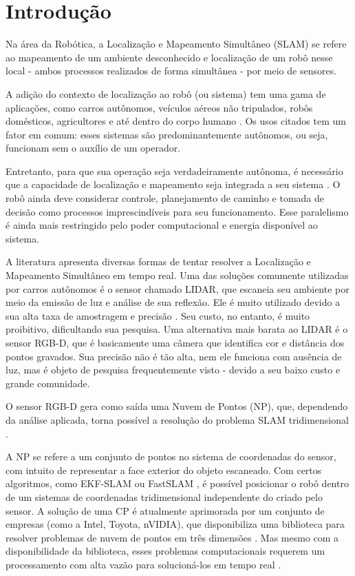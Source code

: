	\chapter*[Introdução]{Introdução}

	Na área da Robótica, a Localização e Mapeamento Simultâneo (SLAM) se refere ao mapeamento de um ambiente desconhecido e localização de um robô nesse local - ambos processos realizados de forma simultânea - por meio de sensores.
	
	A adição do contexto de localização ao robô (ou sistema) tem uma gama de aplicações, como carros autônomos, veículos aéreos não tripulados, robôs domésticos, agricultores e até dentro do corpo humano \cite{bao2014simultaneous}. Os usos citados tem um fator em comum: esses sistemas são predominantemente autônomos, ou seja, funcionam sem o auxílio de um operador.
	
	Entretanto, para que sua operação seja verdadeiramente autônoma, é necessário que a capacidade de localização e mapeamento seja integrada a seu sistema \cite{nikolic2014synchronized}. O robô ainda deve considerar controle, planejamento de caminho e tomada de decisão como processos imprescindíveis para seu funcionamento. Esse paralelismo é ainda mais restringido pelo poder computacional e energia disponível ao sistema.
	
	A literatura apresenta diversas formas de tentar resolver a Localização e Mapeamento Simultâneo em tempo real. Uma das soluções comumente utilizadas por carros autônomos é o sensor chamado LIDAR, que escaneia seu ambiente por meio da emissão de luz e análise de sua reflexão. Ele é muito utilizado devido a sua alta taxa de amostragem e precisão \cite{wolcott2017robust}. Seu custo, no entanto, é muito proibitivo, dificultando sua pesquisa. Uma alternativa mais barata ao LIDAR é o sensor RGB-D, que é basicamente uma câmera que identifica cor e distância dos pontos gravados. Sua precisão não é tão alta, nem ele funciona com ausência de luz, mas é objeto de pesquisa frequentemente visto - devido a seu baixo custo e grande comunidade. 
	
	O sensor RGB-D gera como saída uma Nuvem de Pontos (NP), que, dependendo da análise aplicada, torna possível a resolução do problema SLAM tridimensional \cite{henry2012rgb}. 	
	
	A NP se refere a um conjunto de pontos no sistema de coordenadas do sensor, com intuito de representar a face exterior do objeto escaneado. Com certos algoritmos, como EKF-SLAM ou FastSLAM \cite{durrant2006simultaneous}, é possível posicionar o robô dentro de um sistemas de coordenadas tridimensional independente do criado pelo sensor. A solução de uma CP é atualmente aprimorada por um conjunto de empresas (como a Intel, Toyota, nVIDIA), que disponibiliza uma biblioteca para resolver problemas de nuvem de pontos em três dimensões \cite{Rusu_ICRA2011_PCL}. Mas mesmo com a disponibilidade da biblioteca, esses problemas computacionais requerem um processamento com alta vazão para solucioná-los em tempo real \cite{clipp2010parallel}.
		
